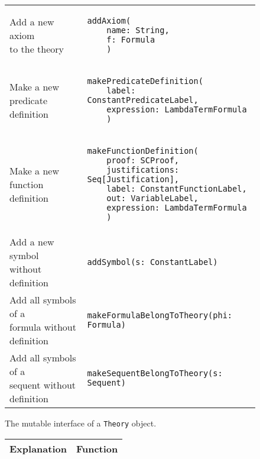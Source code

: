 {\begin{figure}[hp]
\begin{center}
\begin{tabular}{l|l}
\makecell[l]{Add a new axiom\\ to the theory} & 
\begin{lstlisting}
addAxiom(
	name: String,
	f: Formula
	)
\end{lstlisting}
\\ %

\makecell[l]{Make a new\\predicate definition} & 
\begin{lstlisting}
makePredicateDefinition(
	label: ConstantPredicateLabel,
	expression: LambdaTermFormula
	)
\end{lstlisting} 
\\ %

\makecell[l]{Make a new\\function definition} & 
\begin{lstlisting}
makeFunctionDefinition(
	proof: SCProof,
	justifications: Seq[Justification],
	label: ConstantFunctionLabel,
	out: VariableLabel,
	expression: LambdaTermFormula
	)
\end{lstlisting}
\\ %

\makecell[l]{Add a new symbol\\without definition} & 
\begin{lstlisting}
addSymbol(s: ConstantLabel)
\end{lstlisting} 
\\ %

\makecell[l]{Add all symbols of a\\formula without definition} & 
\begin{lstlisting}
makeFormulaBelongToTheory(phi: Formula)
\end{lstlisting} 
\\ %

\makecell[l]{Add all symbols of a\\sequent without definition} & 
\begin{lstlisting}
makeSequentBelongToTheory(s: Sequent)
\end{lstlisting} 
\\ %

\end{tabular}
\caption{The mutable interface of a \lstinline{Theory}{} object.}
\label{fig:theorysetters}
\end{center}
\end{figure}



\begin{figure}[hp]
\begin{center}
\begin{tabular}{l|l}
Explanation & Function
\\ \hline


\end{tabular}
\end{center}
\end{figure}}

